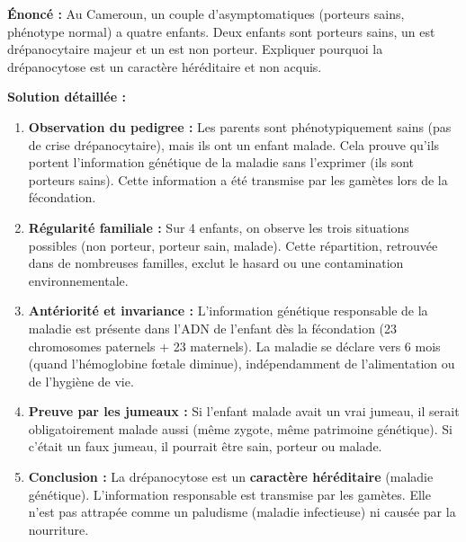 \documentclass[11pt]{article}
\newcounter{popsec}
\newcounter{popsub}
\newcommand{\courssub}[1]{%
  \stepcounter{popsub}%
  \par\vspace{9pt}\noindent{\popxbold\fontsize{11.5}{13}\selectfont\color{popink}{\color{poporange}\thepopsec.\thepopsub}\hspace{6pt}#1}\par\nopagebreak\vspace{4pt}
}
\begin{document}
\begin{exoresolu}
\textbf{Énoncé :} Au Cameroun, un couple d'asymptomatiques (porteurs sains, phénotype normal) a quatre enfants. Deux enfants sont porteurs sains, un est drépanocytaire majeur et un est non porteur. Expliquer pourquoi la drépanocytose est un caractère héréditaire et non acquis.

\textbf{Solution détaillée :}
\begin{enumerate}
    \item \textbf{Observation du pedigree :} Les parents sont phénotypiquement sains (pas de crise drépanocytaire), mais ils ont un enfant malade. Cela prouve qu'ils portent l'information génétique de la maladie sans l'exprimer (ils sont porteurs sains). Cette information a été transmise par les gamètes lors de la fécondation.
    \item \textbf{Régularité familiale :} Sur 4 enfants, on observe les trois situations possibles (non porteur, porteur sain, malade). Cette répartition, retrouvée dans de nombreuses familles, exclut le hasard ou une contamination environnementale.
    \item \textbf{Antériorité et invariance :} L'information génétique responsable de la maladie est présente dans l'ADN de l'enfant dès la fécondation (23 chromosomes paternels + 23 maternels). La maladie se déclare vers 6 mois (quand l'hémoglobine fœtale diminue), indépendamment de l'alimentation ou de l'hygiène de vie.
    \item \textbf{Preuve par les jumeaux :} Si l'enfant malade avait un vrai jumeau, il serait obligatoirement malade aussi (même zygote, même patrimoine génétique). Si c'était un faux jumeau, il pourrait être sain, porteur ou malade.
    \item \textbf{Conclusion :} La drépanocytose est un \textbf{caractère héréditaire} (maladie génétique). L'information responsable est transmise par les gamètes. Elle n'est pas attrapée comme un paludisme (maladie infectieuse) ni causée par la nourriture.
\end{enumerate}
\end{exoresolu}

\courssub{Bilan de la section}
\end{document}
